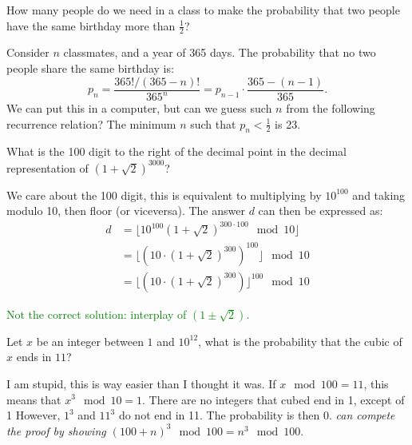\begin{qanda} %
    \Q
    How many people do we need in a class to make the probability that two people have the same birthday more than $\frac{1}{2}$?

    \A
    Consider $n$ classmates, and a year of 365 days.
    The probability that no two people share the same birthday is:
    \[
        p_n = \frac{365! / (365-n)! }{365^n} = 
        p_{n-1} \cdot \frac{365-(n-1)}{365}.
    \]
    We can put this in a computer, but can we guess such $n$ from the following recurrence relation?
    The minimum $n$ such that $p_n < \frac{1}{2}$ is 23.
\end{qanda}

\begin{qanda} %
  \Q
  What is the 100 digit to the right of the decimal point in the decimal representation of $(1 + \sqrt{2})^{3000}$?

  \A
  We care about the 100 digit, this is equivalent to multiplying by $10^{100}$ and taking modulo 10, then floor (or viceversa).
  The answer $d$ can then be expressed as:
  \begin{align*}
      d &= \lfloor 10^{100} (1 + \sqrt{2})^{300 \cdot  100} \mod 10 \rfloor \\
        &= \lfloor (10 \cdot (1+\sqrt{2})^{300} )^{100} \rfloor \mod 10 \\
        &= \lfloor (10 \cdot (1+\sqrt{2})^{300} )\rfloor^{100} \mod 10 
  \end{align*}

  \textcolor{green}{Not the correct solution: interplay of $(1 \pm \sqrt{2})$.}
\end{qanda}

\begin{qanda} %
  \Q
  Let $x$ be an integer between $1$ and $10^{12}$, what is the probability that the cubic of $x$ ends in $11$?

  \A
  I am stupid, this is way easier than I thought it was.
  If $x \mod 100 = 11$, this means that $x^3 \mod 10 = 1$.
  There are no integers that cubed end in 1, except of 1
  However, $1^3$ and $11^3$ do not end in 11.
  The probability is then 0. \textit{can compete the proof by showing $(100+n)^3 \mod 100 = n^3 \mod 100.$}
\end{qanda}

